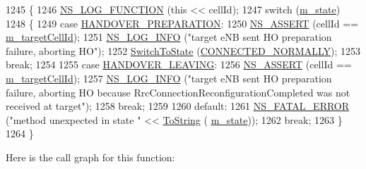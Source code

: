 \begin{DoxyCode}
1245 \{
1246   \hyperlink{log-macros-disabled_8h_a90b90d5bad1f39cb1b64923ea94c0761}{NS\_LOG\_FUNCTION} (\textcolor{keyword}{this} << cellId);
1247   \textcolor{keywordflow}{switch} (\hyperlink{classns3_1_1UeManager_aaed4b2490297cb912e743084f1a27b08}{m\_state})
1248     \{
1249     \textcolor{keywordflow}{case} \hyperlink{classns3_1_1UeManager_a2f4085fdd18d7125c27da44a5b8b6808af12d34cff237916f8322a4b1031ceeda}{HANDOVER\_PREPARATION}:
1250       \hyperlink{assert_8h_a6dccdb0de9b252f60088ce281c49d052}{NS\_ASSERT} (cellId == \hyperlink{classns3_1_1UeManager_a8a70641b8dfb0641e6cfcf4cc83083a3}{m\_targetCellId});
1251       \hyperlink{group__logging_gafbd73ee2cf9f26b319f49086d8e860fb}{NS\_LOG\_INFO} (\textcolor{stringliteral}{"target eNB sent HO preparation failure, aborting HO"});
1252       \hyperlink{classns3_1_1UeManager_af2b5ad90fc6f16ffc4a91fbe8a522472}{SwitchToState} (\hyperlink{classns3_1_1UeManager_a2f4085fdd18d7125c27da44a5b8b6808a2a1020dce30f19aa9354ba34b2e7c5e0}{CONNECTED\_NORMALLY});
1253       \textcolor{keywordflow}{break};
1254 
1255     \textcolor{keywordflow}{case} \hyperlink{classns3_1_1UeManager_a2f4085fdd18d7125c27da44a5b8b6808ae67953d7b8e117cbd2cab21a1fcde8ad}{HANDOVER\_LEAVING}:
1256       \hyperlink{assert_8h_a6dccdb0de9b252f60088ce281c49d052}{NS\_ASSERT} (cellId == \hyperlink{classns3_1_1UeManager_a8a70641b8dfb0641e6cfcf4cc83083a3}{m\_targetCellId});
1257       \hyperlink{group__logging_gafbd73ee2cf9f26b319f49086d8e860fb}{NS\_LOG\_INFO} (\textcolor{stringliteral}{"target eNB sent HO preparation failure, aborting HO because
       RrcConnectionReconfigurationCompleted was not received at target"});
1258       \textcolor{keywordflow}{break};
1259 
1260     \textcolor{keywordflow}{default}:
1261       \hyperlink{group__fatal_ga5131d5e3f75d7d4cbfd706ac456fdc85}{NS\_FATAL\_ERROR} (\textcolor{stringliteral}{"method unexpected in state "} << \hyperlink{namespacens3_a3d1f7e1bec1972e2ae8d64673fcfcd9c}{ToString} (
      \hyperlink{classns3_1_1UeManager_aaed4b2490297cb912e743084f1a27b08}{m\_state}));
1262       \textcolor{keywordflow}{break};
1263     \}
1264 \}
\end{DoxyCode}


Here is the call graph for this function\+:


